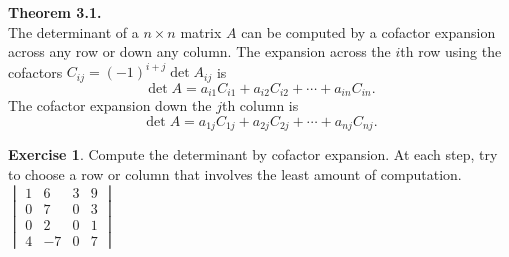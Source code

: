 \documentclass[10pt]{book}
\newcommand{\boxcolor}{gray!30}
\newenvironment{boxthm}{\begin{mdframed}[backgroundcolor=\boxcolor,nobreak=true]}{\end{mdframed}}
\theoremstyle{definition}
\newtheorem{exercise}{Exercise}[section]
\begin{document}
\newpage

\begin{boxthm}
	\textbf{Theorem 3.1.} \\
	The determinant of a $n\times n$ matrix $A$ can be computed by a cofactor expansion across any row or down any column. The expansion across the $i$th row using the cofactors $C_{ij} = (-1)^{i+j}\det A_{ij}$ is
	$$ \det A = a_{i1}C_{i1} + a_{i2}C_{i2} + \cdots + a_{in}C_{in}. $$
	The cofactor expansion down the $j$th column is
	$$ \det A = a_{1j}C_{1j} + a_{2j}C_{2j} + \cdots + a_{nj}C_{nj}. $$
\end{boxthm}

\begin{exercise} %
	Compute the determinant by cofactor expansion. At each step, try to choose a row or column that involves the least amount of computation. \\
	
	$\begin{vmatrix}1&6&3&9\\0&7&0&3\\0&2&0&1\\4&-7&0&7\end{vmatrix}$
\end{exercise}
\vfill
\end{document}
